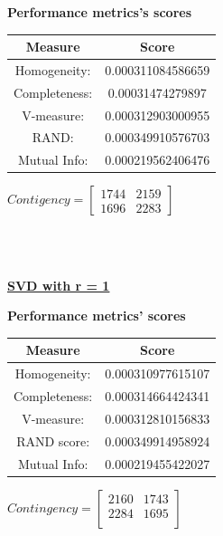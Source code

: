 \documentclass{article}
\begin{document}
\begin{center}
	\textbf{Performance metrics's scores} \\ \vspace{10pt}
	\begin{tabular}{*{2}{c}}
		\toprule
		\textbf{Measure} & \textbf{Score} \\
		\midrule	
		Homogeneity: & 0.000311084586659 \\
		\midrule
		Completeness: & 0.00031474279897 \\
		\midrule
		V-measure: & 0.000312903000955 \\
		\midrule
		RAND: & 0.000349910576703 \\
		\midrule
		Mutual Info: & 0.000219562406476 \\
		\bottomrule
	\end{tabular}
	\qquad
	$Contigency = \left[ \begin{array}{*{2}{c}}
			    1744 & 2159\\
			    1696 & 2283				
				\end{array}\right]
			$
\end{center}

\\  \\ \vspace{20pt}


\underline{\textbf{SVD with r = 1}} 

\begin{center}
	\textbf{Performance metrics' scores} \\  \vspace{10pt}
	\begin{tabular}{*{2}{c}}		
		\toprule
		\textbf{Measure} & \textbf{Score} \\
		\midrule
		Homogeneity: & 0.000310977615107 \\
		\mdirule 
		Completeness: & 0.000314664424341 \\
		\midrule
		V-measure: & 0.000312810156833  \\
		\midrule
		RAND score: & 0.000349914958924  \\
		\midrule
		Mutual Info:  & 0.000219455422027 \\
		\bottomrule
	\end{tabular}
	\qquad
	$Contingency = \left[\begin{array}{*{2}{c}}
		 2160	& 1743 \\
 		 2284 	& 1695 \\ 
			\end{array}\right]
		$
\end{center}
\end{document}
